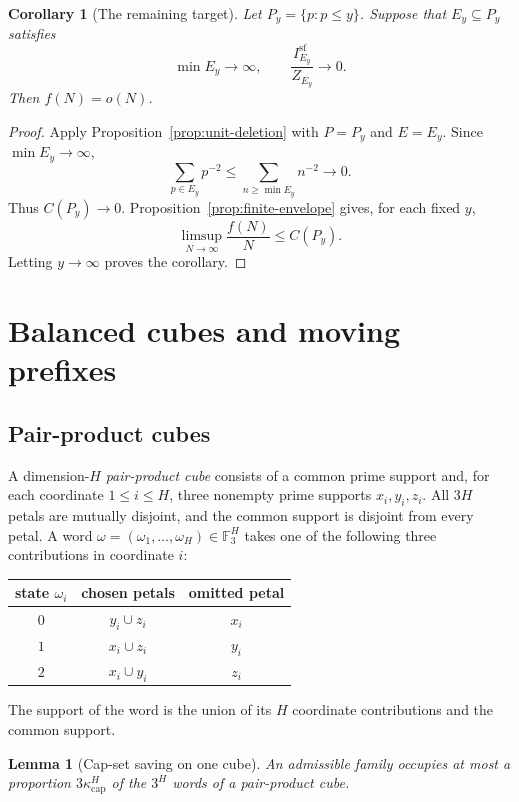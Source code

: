 \documentclass[11pt]{article}
\numberwithin{equation}{section}
\theoremstyle{plain}
\newtheorem{lemma}[theorem]{Lemma}
\newtheorem{corollary}[theorem]{Corollary}
\newcommand{\F}{\mathbb F}
\newcommand{\1}{\mathbf 1}
\newcommand{\kappacap}{\kappa_{\mathrm{cap}}}
\begin{document}
\begin{corollary}[The remaining target]\label{cor:capacity-target}
Let $P_y=\{p:p\le y\}$.  Suppose that $E_y\subseteq P_y$ satisfies
\begin{equation}\label{eq:capacity-target}
 \min E_y\longrightarrow\infty,
 \qquad
 \frac{I_{E_y}^{\mathrm{sf}}}{Z_{E_y}}\longrightarrow0.
\end{equation}
Then $f(N)=o(N)$.
\end{corollary}

\begin{proof}
Apply Proposition~\ref{prop:unit-deletion} with $P=P_y$ and $E=E_y$.
Since $\min E_y\to\infty$,
\[
 \sum_{p\in E_y}p^{-2}
 \le\sum_{n\ge\min E_y}n^{-2}\longrightarrow0.
\]
Thus $C(P_y)\to0$.  Proposition~\ref{prop:finite-envelope} gives, for each
fixed $y$,
\[
 \limsup_{N\to\infty}\frac{f(N)}N\le C(P_y).
\]
Letting $y\to\infty$ proves the corollary.
\end{proof}

\section{Balanced cubes and moving prefixes}\label{sec:cubes}

\subsection{Pair-product cubes}

A dimension-$H$ \emph{pair-product cube} consists of a common prime support
and, for each coordinate $1\le i\le H$, three nonempty prime supports
$x_i,y_i,z_i$.  All $3H$ petals are mutually disjoint, and the common
support is disjoint from every petal.  A word
$\omega=(\omega_1,\ldots,\omega_H)\in\F_3^H$ takes one of the following
three contributions in coordinate $i$:
\begin{center}
\begin{tabular}{c c c}
\toprule
state $\omega_i$ & chosen petals & omitted petal\\
\midrule
$0$ & $y_i\cup z_i$ & $x_i$\\
$1$ & $x_i\cup z_i$ & $y_i$\\
$2$ & $x_i\cup y_i$ & $z_i$\\
\bottomrule
\end{tabular}
\end{center}
The support of the word is the union of its $H$ coordinate contributions
and the common support.

\begin{lemma}[Cap-set saving on one cube]\label{lem:cube-saving}
An admissible family occupies at most a proportion
$3\kappacap^H$ of the $3^H$ words of a pair-product cube.
\end{lemma}
\end{document}
